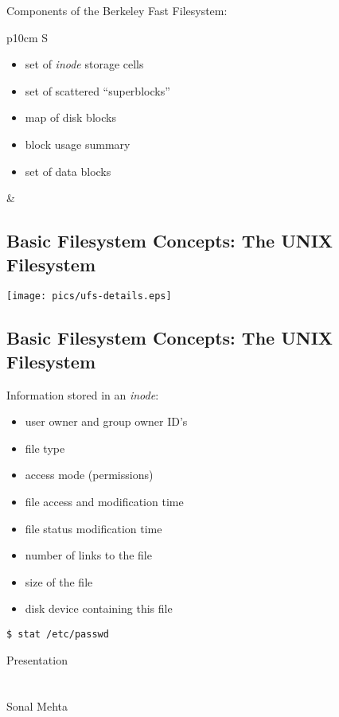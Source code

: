 \documentclass[xga]{xdvislides}
\begin{document}
Components of the Berkeley Fast Filesystem:
\\

\begin{tabular}{ p{10cm} S }
\begin{itemize}
	\item set of {\em inode} storage cells
	\item set of scattered ``superblocks''
	\item map of disk blocks
	\item block usage summary
	\item set of data blocks
\end{itemize}
&  \\
\end{tabular}

\subsection{Basic Filesystem Concepts: The UNIX Filesystem}
\begin{center}
	\texttt{[image: pics/ufs-details.eps]} \\
\end{center}
\vspace*{\fill}

\subsection{Basic Filesystem Concepts: The UNIX Filesystem}
Information stored in an {\em inode}:
\begin{itemize}
	\item user owner and group owner ID's
	\item file type
	\item access mode (permissions)
	\item file access and modification time
	\item file status modification time
	\item number of links to the file
	\item size of the file
	\item disk device containing this file
\end{itemize}

\begin{verbatim}
$ stat /etc/passwd
\end{verbatim}

\newpage
\vspace*{\fill}
\begin{center}
    \Hugesize
        Presentation \\ [1em]
    \hspace*{5mm}
    \blueline\\
    \hspace*{5mm}\\
	Sonal Mehta
\end{center}
\vspace*{\fill}
\end{document}
